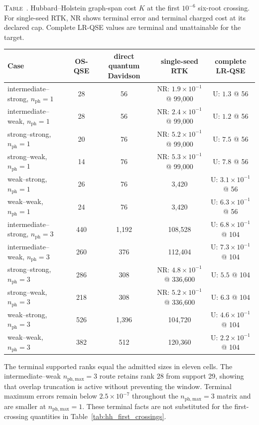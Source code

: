 \documentclass[
  reprint,
  amsmath,
  amssymb,
  aps,
  pra,
  nofootinbib,
  superscriptaddress,
  floatfix
]{revtex4-2}
\newcommand{\phmax}{n_{\mathrm{ph,max}}}
\newcommand{\nph}{n_{\mathrm{ph}}}
\newcommand{\inlinetablecaption}[2]{%
  \refstepcounter{table}\label{#1}%
  \noindent\textsc{Table~\thetable.} #2\par\vspace{0.6ex}%
}
\begin{document}
\begin{widetext}
\inlinetablecaption{tab:hh_first_crossings}{Hubbard--Holstein graph-span cost
$K$ at the first $10^{-6}$ six-root crossing.  For single-seed RTK, NR shows
terminal error and terminal charged cost at its declared cap.  Complete
LR-QSE values are terminal and unattainable for the target.}
\begin{center}
\scriptsize
\begin{tabular*}{\textwidth}{@{\extracolsep{\fill}}lcccc@{}}
\toprule
Case & OS-QSE & direct quantum Davidson & single-seed RTK & complete LR-QSE \\
\midrule
intermediate--strong, $\nph=1$ & 28 & 56 & NR: $1.9\times10^{-1}$ @ 99,000 & U: $1.3$ @ 56 \\
intermediate--weak, $\nph=1$ & 28 & 56 & NR: $2.4\times10^{-1}$ @ 99,000 & U: $1.2$ @ 56 \\
strong--strong, $\nph=1$ & 20 & 76 & NR: $5.2\times10^{-1}$ @ 99,000 & U: $7.5$ @ 56 \\
strong--weak, $\nph=1$ & 14 & 76 & NR: $5.3\times10^{-1}$ @ 99,000 & U: $7.8$ @ 56 \\
weak--strong, $\nph=1$ & 26 & 76 & 3,420 & U: $3.1\times10^{-1}$ @ 56 \\
weak--weak, $\nph=1$ & 24 & 76 & 3,420 & U: $6.3\times10^{-1}$ @ 56 \\
intermediate--strong, $\nph=3$ & 440 & 1,192 & 108,528 & U: $6.8\times10^{-1}$ @ 104 \\
intermediate--weak, $\nph=3$ & 260 & 376 & 112,404 & U: $7.3\times10^{-1}$ @ 104 \\
strong--strong, $\nph=3$ & 286 & 308 & NR: $4.8\times10^{-1}$ @ 336,600 & U: $5.5$ @ 104 \\
strong--weak, $\nph=3$ & 218 & 308 & NR: $5.2\times10^{-1}$ @ 336,600 & U: $6.3$ @ 104 \\
weak--strong, $\nph=3$ & 526 & 1,396 & 104,720 & U: $4.6\times10^{-1}$ @ 104 \\
weak--weak, $\nph=3$ & 382 & 512 & 120,360 & U: $2.2\times10^{-1}$ @ 104 \\
\bottomrule
\end{tabular*}
\end{center}
\end{widetext}

The terminal supported ranks equal the admitted sizes in eleven cells.  The
intermediate--weak $\phmax=3$ route retains rank 28 from support 29, showing
that overlap truncation is active without preventing the window.  Terminal
maximum errors remain below $2.5\times10^{-7}$ throughout the $\phmax=3$
matrix and are smaller at $\phmax=1$.  These terminal facts are not substituted
for the first-crossing quantities in Table~\ref{tab:hh_first_crossings}.
\end{document}
